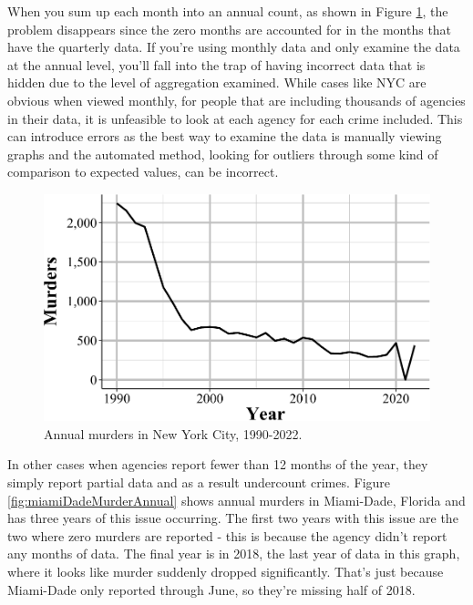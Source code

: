 \documentclass[
  12pt,
  openany]{book}
\begin{document}
When you sum up each month into an annual count, as shown in Figure \ref{fig:nycMurderYearly}, the problem disappears since the zero months are accounted for in the months that have the quarterly data. If you're using monthly data and only examine the data at the annual level, you'll fall into the trap of having incorrect data that is hidden due to the level of aggregation examined. While cases like NYC are obvious when viewed monthly, for people that are including thousands of agencies in their data, it is unfeasible to look at each agency for each crime included. This can introduce errors as the best way to examine the data is manually viewing graphs and the automated method, looking for outliers through some kind of comparison to expected values, can be incorrect.

\begin{figure}

{\centering \includegraphics[width=0.9\linewidth]{index_files/figure-latex/nycMurderYearly-1} 

}

\caption{Annual murders in New York City, 1990-2022.}\label{fig:nycMurderYearly}
\end{figure}

In other cases when agencies report fewer than 12 months of the year, they simply report partial data and as a result undercount crimes. Figure \ref{fig:miamiDadeMurderAnnual} shows annual murders in Miami-Dade, Florida and has three years of this issue occurring. The first two years with this issue are the two where zero murders are reported - this is because the agency didn't report any months of data. The final year is in 2018, the last year of data in this graph, where it looks like murder suddenly dropped significantly. That's just because Miami-Dade only reported through June, so they're missing half of 2018.
\end{document}
